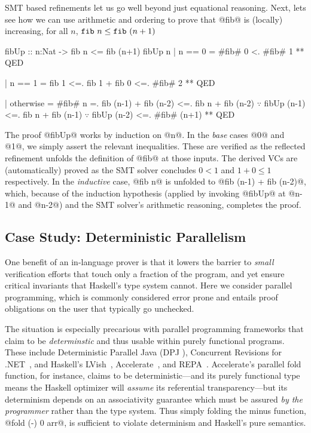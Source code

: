 %
SMT based refinements let us go well beyond just equational
reasoning. Next, lets see how we can use arithmetic and
ordering to prove that @fib@ is (locally) increasing,
%
\ie for all $n$, $\texttt{fib}\ {n} \leq \texttt{fib}\ {(n+1)}$
%
\begin{mcode}
  fibUp :: n:Nat -> { fib n <= fib (n+1) }
  fibUp n
    | n == 0
    =  #fib# 0 <. #fib# 1
    ** QED

    | n == 1
    =  fib 1 <=. fib 1 + fib 0 <=. #fib# 2
    ** QED

    | otherwise
    =  #fib# n
    =. fib (n-1) + fib (n-2)
    <=. fib n     + fib (n-2) $\because$ fibUp (n-1)
    <=. fib n     + fib (n-1) $\because$ fibUp (n-2)
    <=. #fib# (n+1)
    ** QED
\end{mcode} %

%
The proof @fibUp@ works by induction on @n@.
%
In the \emph{base} cases @0@ and @1@, we simply assert
the relevant inequalities. These are verified as the
reflected refinement unfolds the definition of
@fib@ at those inputs.
%
The derived VCs are (automatically) proved
as the SMT solver concludes $0 < 1$ and $1 + 0 \leq 1$
respectively.
%
In the \emph{inductive} case, @fib n@ is unfolded
to  @fib (n-1) + fib (n-2)@, which, because of the
induction hypothesis (applied by invoking @fibUp@
at @n-1@ and @n-2@) and the SMT solver's arithmetic
reasoning, completes the proof.


\subsection{Case Study: Deterministic Parallelism}
\label{sec:detpar}


One benefit of an in-language prover is that it lowers the barrier to {\em
  small} verification efforts that touch only a fraction of the program, and yet
ensure critical invariants that Haskell's type system cannot.  Here we consider
parallel programming, which is commonly considered error prone and entails
proof obligations on the user that typically go unchecked.

The situation is especially precarious with parallel programming frameworks that
claim to be {\em determinstic} and thus usable within purely functional
programs.  These include Deterministic Parallel Java (DPJ \cite{DPJ}), Concurrent
Revisions for .NET~\cite{concurrent-revisions-oopsla}, and Haskell's
LVish~\cite{kuper2014freeze}, Accelerate~\cite{accelerate-icfp13}, and
REPA~\cite{repa-icfp10}.
%
Accelerate's parallel fold function, for instance, claims to be
deterministic---and its purely functional type means the Haskell optimizer will
{\em assume} its referential transparency---but its determinism depends on an
associativity guarantee which must be assured {\em by the programmer} rather than the
type system.
%
Thus simply folding the minus function, @fold (-) 0 arr@, is sufficient to
violate determinism and Haskell's pure semantics.


